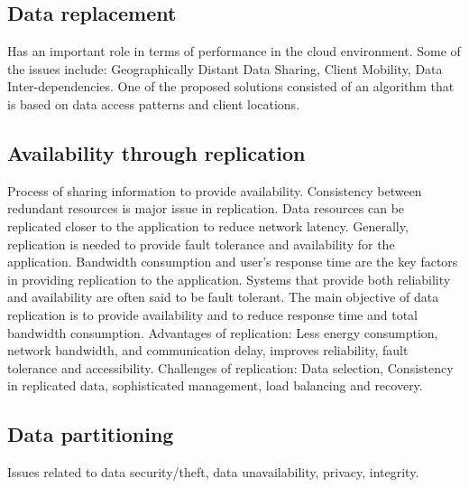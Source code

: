 \documentclass[14pt,oneside]{extreport}
\newcommand*\fpar{\hspace{1ex}}
\begin{document}
\subsection{Data replacement}
\fpar Has an important role in terms of performance in the cloud environment. Some of the issues include: Geographically Distant Data Sharing, Client Mobility, Data Inter-dependencies. One of the proposed solutions consisted of an algorithm that is based on data access patterns and client locations.
\subsection{Availability through replication}
\fpar Process of sharing information to provide availability. Consistency between redundant resources is major issue in replication. Data resources can be replicated closer to the application to reduce network latency. Generally, replication is needed to provide fault tolerance and availability for the application. Bandwidth consumption and user’s response time are the key factors in providing replication to the application. Systems that provide both reliability and availability are often said to be fault tolerant. The main objective of data replication is to provide availability and to reduce response time and total bandwidth consumption. Advantages of replication: Less energy consumption, network bandwidth, and communication delay, improves reliability, fault tolerance and accessibility. Challenges of replication: Data selection, Consistency in replicated data, sophisticated management, load balancing and recovery.
\subsection{Data partitioning} 
\fpar Issues related to data security/theft, data unavailability, privacy, integrity.
\end{document}
